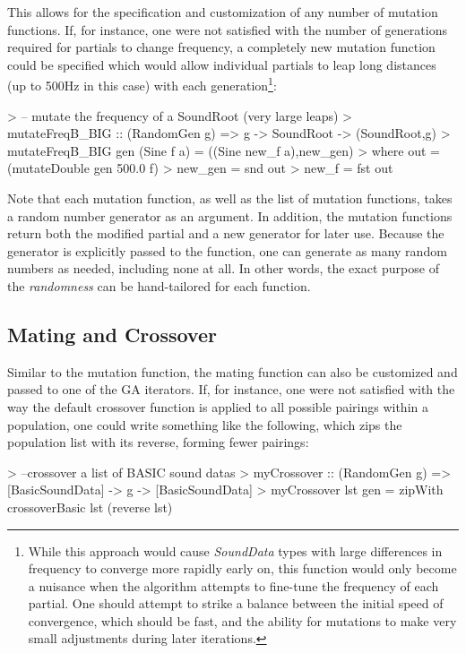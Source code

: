 \documentclass[11pt]{article}
\begin{document}
This allows for the specification and customization of any number of mutation functions. If, for instance, one were not satisfied with the number of generations required for partials to change frequency, a completely new mutation function could be specified which would allow individual partials to leap long distances (up to 500Hz in this case) with each generation\footnote{While this approach would cause \emph{SoundData} types with large differences in frequency to converge more rapidly early on, this function would only become a nuisance when the algorithm attempts to fine-tune the frequency of each partial. One should attempt to strike a balance between the initial speed of convergence, which should be fast, and the ability for mutations to make very small adjustments during later iterations.}:

\begin{code}
> -- mutate the frequency of a SoundRoot (very large leaps)
> mutateFreqB_BIG :: (RandomGen g) => g -> SoundRoot -> (SoundRoot,g)
> mutateFreqB_BIG gen (Sine f a) = ((Sine new_f a),new_gen)
>   where out = (mutateDouble gen 500.0 f)
>         new_gen = snd out
>         new_f = fst out
\end{code}

Note that each mutation function, as well as the list of mutation functions, takes a random number generator as an argument. In addition, the mutation functions return both the modified partial and a new generator for later use. Because the generator is explicitly passed to the function, one can generate as many random numbers as needed, including none at all. In other words, the exact purpose of the \emph{randomness} can be hand-tailored for each function.

\subsection{Mating and Crossover}

Similar to the mutation function, the mating function can also be customized and passed to one of the GA iterators. If, for instance, one were not satisfied with the way the default crossover function is applied to all possible pairings within a population, one could write something like the following, which zips the population list with its reverse, forming fewer pairings:

\begin{code}
> --crossover a list of BASIC sound datas
> myCrossover :: (RandomGen g) => [BasicSoundData] -> g -> [BasicSoundData]
> myCrossover lst gen = zipWith crossoverBasic lst (reverse lst)
\end{code}
\end{document}
